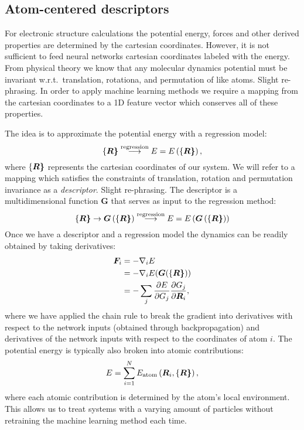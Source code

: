 \subsection{Atom-centered descriptors}
For electronic structure calculations the potential energy,
forces and other derived properties are determined by
the cartesian coordinates. However, it is not sufficient
to feed neural networks cartesian coordinates labeled with
the energy. From physical theory we know that any molecular dynamics potential
must be invariant w.r.t.\ translation, rotationa, and permutation
of like atoms. {\color{red} Slight re-phrasing.}
In order to apply machine learning methods we require a mapping from
the cartesian coordinates to a 1D feature vector which conserves
all of these properties.
\par
The idea is to approximate the potential energy with a regression model:
\begin{equation}
\left\{\bm{R\right\}} \overset{\text{regression}}{\longrightarrow}
E = E\left( \left\{\bm{R\right\}} \right) ,
\end{equation}
where $\left\{\bm{R\right\}}$ represents the cartesian coordinates of our system.
We will refer to a mapping which satisfies the constraints of 
translation, rotation and permutation invariance as a \textit{descriptor}. 
{\color{red} Slight re-phrasing.}
The descriptor is a multidimensional function $\bm{G}$ that serves as input to
the regression method:
\begin{equation}
\left\{\bm{R\right\}} \rightarrow \bm{G} \left(\left\{\bm{R\right\}} \right)
\overset{\text{regression}}{\longrightarrow}
E = E \left(\bm{G}\left(\left\{\bm{R\right\}}\right)\right)
\end{equation}
Once we have a descriptor and a regression model the dynamics
can be readily obtained by taking derivatives:
\begin{equation}
\begin{split}
    \bm{F}_i &= -\nabla_i E \\
    &= -\nabla_i
    E(\bm{G}(\left\{\bm{R\right\}})) \\
    &= -\sum_j \frac{\partial E}
    {\partial G_j} \frac{\partial G_j}{\partial \bm{R}_i} ,
\end{split}
\end{equation}
where we have applied the chain rule to break the gradient
into derivatives with respect to the network inputs (obtained through
backpropagation) and derivatives of the network inputs with
respect to the coordinates of atom $i$.
The potential energy is typically also broken into
atomic contributions:
\begin{equation}
E = \sum_{i=1}^N E_{\text{atom}}\left(\bm{R}_i, \left\{\bm{R\right\}} \right) ,
\end{equation}
where each atomic contribution is determined by the atom's
local environment. This allows us to treat systems with
a varying amount of particles without retraining
the machine learning method each time.

